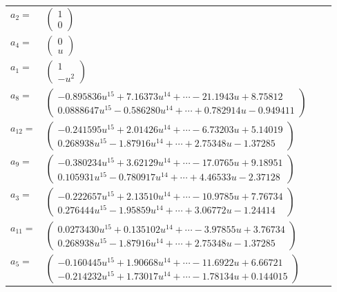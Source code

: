 \documentclass[1p]{elsarticle_modified}
\theoremstyle{definition}
\begin{document}
\begin{tabular}{m{7pt} m{180pt} m{7pt} m{180pt} }
\flushright $a_{2}=$&$\begin{pmatrix}1\\0\end{pmatrix}$ \\
\flushright $a_{4}=$&$\begin{pmatrix}0\\u\end{pmatrix}$ \\
\flushright $a_{1}=$&$\begin{pmatrix}1\\- u^2\end{pmatrix}$ \\
\flushright $a_{8}=$&$\begin{pmatrix}-0.895836 u^{15}+7.16373 u^{14}+\cdots-21.1943 u+8.75812\\0.0888647 u^{15}-0.586280 u^{14}+\cdots+0.782914 u-0.949411\end{pmatrix}$ \\
\flushright $a_{12}=$&$\begin{pmatrix}-0.241595 u^{15}+2.01426 u^{14}+\cdots-6.73203 u+5.14019\\0.268938 u^{15}-1.87916 u^{14}+\cdots+2.75348 u-1.37285\end{pmatrix}$ \\
\flushright $a_{9}=$&$\begin{pmatrix}-0.380234 u^{15}+3.62129 u^{14}+\cdots-17.0765 u+9.18951\\0.105931 u^{15}-0.780917 u^{14}+\cdots+4.46533 u-2.37128\end{pmatrix}$ \\
\flushright $a_{3}=$&$\begin{pmatrix}-0.222657 u^{15}+2.13510 u^{14}+\cdots-10.9785 u+7.76734\\0.276444 u^{15}-1.95859 u^{14}+\cdots+3.06772 u-1.24414\end{pmatrix}$ \\
\flushright $a_{11}=$&$\begin{pmatrix}0.0273430 u^{15}+0.135102 u^{14}+\cdots-3.97855 u+3.76734\\0.268938 u^{15}-1.87916 u^{14}+\cdots+2.75348 u-1.37285\end{pmatrix}$ \\
\flushright $a_{5}=$&$\begin{pmatrix}-0.160445 u^{15}+1.90668 u^{14}+\cdots-11.6922 u+6.66721\\-0.214232 u^{15}+1.73017 u^{14}+\cdots-1.78134 u+0.144015\end{pmatrix}$ \\

\end{tabular}
\end{document}
